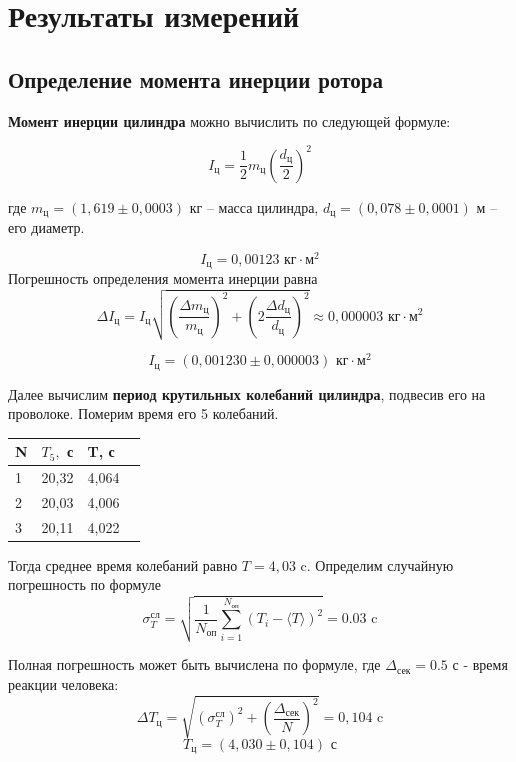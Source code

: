 \documentclass[a4paper,12pt]{article}
\begin{document}
\setcounter{section}{4}
\section{Результаты измерений}

\subsection*{Определение момента инерции ротора}
\textbf{Момент инерции цилиндра} можно вычислить по следующей формуле:

$$I_\text{ц} = \frac{1}{2}m_\text{ц}\left( \frac{d_\text{ц}}{2}\right)^2$$

где $ m_\text{ц} = (1,619 \pm 0,0003) $ кг -- масса цилиндра, $ d_\text{ц} = (0,078 \pm 0,0001) $ м -- его диаметр.

$$I_\text{ц} = 0,00123 \text{ кг} \cdot \text{м}^2$$
Погрешность определения момента инерции равна 
$$\Delta I_\text{ц} = I_\text{ц}\sqrt{\left( \frac{\Delta m_\text{ц}}{m_\text{ц}} \right)^2 + \left(2 \frac{\Delta d_\text{ц}}{d_\text{ц}} \right)^2 } \approx 0,000003 \text{ кг} \cdot \text{м}^2$$

$$I_\text{ц} = \left(0,001230 \pm 0,000003 \right) \text{ кг} \cdot \text{м}^2$$

Далее вычислим \textbf{период крутильных колебаний цилиндра}, подвесив его на проволоке. Померим время его 5 колебаний.

\begin{table}[!ht]
    \centering
    \begin{tabular}{|l|l|l|l|}
    \hline
        N & $T_5,$ с & T, с \\ \hline
        1 & 20,32 & 4,064 \\ \hline
        2 & 20,03 & 4,006 \\ \hline
        3 & 20,11 & 4,022 \\ \hline
    \end{tabular}
\end{table}
Тогда среднее время колебаний равно $T = 4,03$ c. Определим случайную погрешность по формуле
$$\sigma^{\text{сл}}_T = \sqrt{\frac{1}{N_\text{оп}} \sum_{i = 1}^{N_\text{оп}} \left(T_i - \langle T \rangle \right)^2} = 0.03 \text{ c}$$

Полная погрешность может быть вычислена по формуле, где $\Delta_\text{сек} = 0.5$ с - время реакции человека:
$$ \Delta T_ц = \sqrt{\left( \sigma^\text{сл}_T \right)^2 + \left(\frac{\Delta_\text{сек}}{N}  \right)^2  } = 0,104 \text{ c}$$
$$ T_\text{ц} = \left( 4,030 \pm 0,104\right) \text{ с} $$
\end{document}
